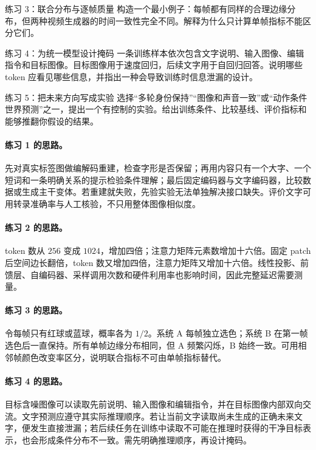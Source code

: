 \begin{exercisebox}{练习 3：联合分布与逐帧质量}
构造一个最小例子：每帧都有同样的合理边缘分布，但两种视频生成器的时间一致性完全不同。解释为什么只计算单帧指标不能区分它们。
\end{exercisebox}

\begin{exercisebox}{练习 4：为统一模型设计掩码}
一条训练样本依次包含文字说明、输入图像、编辑指令和目标图像。目标图像用于速度回归，后续文字用于自回归回答。说明哪些 token 应看见哪些信息，并指出一种会导致训练时信息泄漏的设计。
\end{exercisebox}

\begin{exercisebox}{练习 5：把未来方向写成实验}
选择“多轮身份保持”“图像和声音一致”或“动作条件世界预测”之一，提出一个有控制的实验。给出训练条件、比较基线、评价指标和能够推翻你假设的结果。
\end{exercisebox}

\paragraph{练习 1 的思路。}
先对真实标签图做编解码重建，检查字形是否保留；再用内容只有一个大字、一个短词和一条明确关系的提示检验条件理解；最后固定编码器与文字编码器，比较数据或生成主干变体。若重建就失败，先验实验无法单独解决接口缺失。评价文字可用转录准确率与人工核验，不只用整体图像相似度。

\paragraph{练习 2 的思路。}
token 数从 $256$ 变成 $1024$，增加四倍；注意力矩阵元素数增加十六倍。固定 patch 后空间边长翻倍，token 数又增加四倍，注意力矩阵又增加十六倍。线性投影、前馈层、自编码器、采样调用次数和硬件利用率也影响时间，因此完整延迟需要测量。

\paragraph{练习 3 的思路。}
令每帧只有红球或蓝球，概率各为 $1/2$。系统 A 每帧独立选色；系统 B 在第一帧选色后一直保持。所有单帧边缘分布相同，但 A 频繁闪烁，B 始终一致。可用相邻帧颜色改变率区分，说明联合指标不可由单帧指标替代。

\paragraph{练习 4 的思路。}
目标含噪图像可以读取先前说明、输入图像和编辑指令，并在目标图像内部双向交流。文字预测应遵守其实际推理顺序。若让当前文字读取尚未生成的正确未来文字，便发生直接泄漏；若后续任务在训练中读取不可能在推理时获得的干净目标表示，也会形成条件分布不一致。需先明确推理顺序，再设计掩码。

